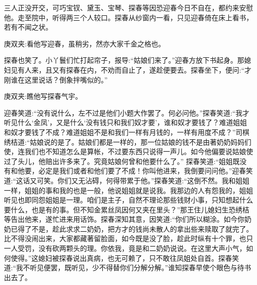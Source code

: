 \begin{parag}
    三人正没开交，可巧宝钗、黛玉、宝琴、探春等因恐迎春今日不自在，都约来安慰他。走至院中，听得两三个人较口。探春从纱窗内一看，只见迎春倚在床上看书，若有不闻之状。\begin{note}庚双夹:看他写迎春，虽稍劣，然亦大家千金之格也。\end{note}探春也笑了。小丫鬟们忙打起帘子，报导:“姑娘们来了。”迎春方放下书起身。那媳妇见有人来，且又有探春在内，不劝而自止了，遂趁便要去。探春坐下，便问:“才刚谁在这里说话？倒象拌嘴似的。”\begin{note}庚双夹:瞧他写探春气宇。\end{note}迎春笑道:“没有说什么，左不过是他们小题大作罢了。何必问他。”探春笑道:“我才听见什么‘金凤’，又是什么‘没有钱只和我们奴才要’，谁和奴才要钱了？难道姐姐和奴才要钱了不成？难道姐姐不是和我们一样有月钱的，一样有用度不成？”司棋绣桔道:“姑娘说的是了。姑娘们都是一样的，那一位姑娘的钱不是由著奶奶妈妈们使，连我们也不知道怎么是算帐，不过要东西只说得一声儿。如今他偏要说姑娘使过了头儿，他赔出许多来了。究竟姑娘何曾和他要什么了。” 探春笑道:“姐姐既没有和他要，必定是我们或者和他们要了不成！你叫他进来，我倒要问问他。”迎春笑道:“这话又可笑。你们又无沾碍，何得带累于他。”探春笑道:“这倒不然。我和姐姐一样，姐姐的事和我的也是一般，他说姐姐就是说我。我那边的人有怨我的，姐姐听见也即同怨姐姐是一理。咱们是主子，自然不理论那些钱财小事，只知想起什么要什么，也是有的事。但不知金累丝凤因何又夹在里头？”那王住儿媳妇生恐绣桔等告出他来，遂忙进来用话饰。探春深知其意，因笑道:“你们所以糊涂。如今你奶奶已得了不是，趁此求求二奶奶，把方才的钱尚未散人的拿出些来赎取了就完了。比不得没闹出来，大家都藏著留脸面，如今既是没了脸，趁此时纵有十个罪，也只一人受罚，没有砍两颗头的理。你依我，竟是和二奶奶说说。在这里大声小气，如何使得。”这媳妇被探春说出真病，也无可赖了，只不敢往凤姐处自首。探春笑道:“我不听见便罢，既听见，少不得替你们分解分解。”谁知探春早使个眼色与待书出去了。
\end{parag}


